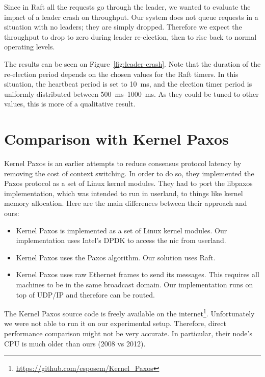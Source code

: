 Since in Raft all the requests go through the leader, we wanted to evaluate the impact of a leader crash on throughput.
Our system does not queue requests in a situation with no leaders; they are simply dropped.
Therefore we expect the throughput to drop to zero during leader re-election, then to rise back to normal operating levels.

The results can be seen on Figure~\ref{fig:leader-crash}.
Note that the duration of the re-election period depends on the chosen values for the Raft timers.
In this situation, the heartbeat period is set to \SI{10}{\milli\second}, and the election timer period is uniformly distributed between \SIrange{500}{1000}{\milli\second}.
As they could be tuned to other values, this is more of a qualitative result.


\section{Comparison with Kernel Paxos}

Kernel Paxos\cite{kernelpaxos} is an earlier attempts to reduce consensus protocol latency by removing the cost of context switching.
In order to do so, they implemented the Paxos protocol as a set of Linux kernel modules.
They had to port the libpaxos implementation, which was intended to run in userland, to things like kernel memory allocation.
Here are the main differences between their approach and ours:

\begin{itemize}
    \item Kernel Paxos is implemented as a set of Linux kernel modules.
        Our implementation uses Intel's DPDK\cite{dpdk} to access the \gls{nic} from userland.
    \item Kernel Paxos uses the Paxos algorithm.
        Our solution uses Raft.
    \item Kernel Paxos uses raw Ethernet frames to send its messages.
        This requires all machines to be in the same broadcast domain.
        Our implementation runs on top of UDP/IP and therefore can be routed.
\end{itemize}

The Kernel Paxos source code is freely available on the internet\footnote{\url{https://github.com/esposem/Kernel_Paxos}}.
Unfortunately we were not able to run it on our experimental setup.
Therefore, direct performance comparison might not be very accurate.
In particular, their node's CPU is much older than ours (2008 vs 2012).

